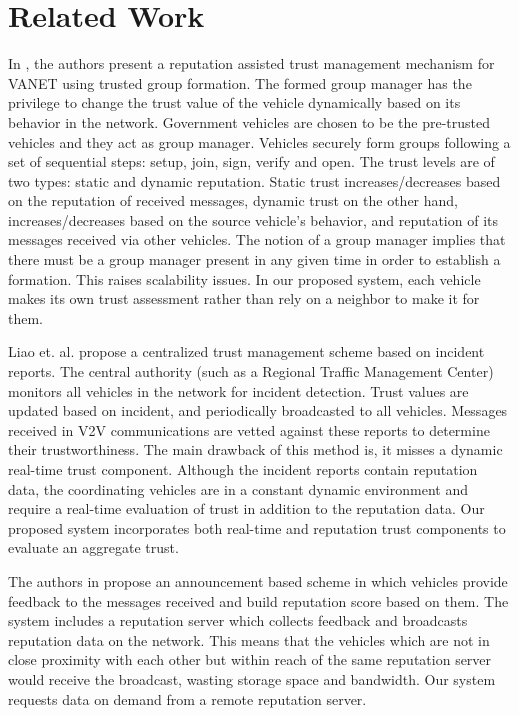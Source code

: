 \documentclass[conference]{IEEEtran}
\begin{document}
\section{Related Work} \label{lreview}
In \cite{tgroupFormVANET}, the authors present a reputation assisted trust management mechanism for VANET using trusted group formation. 
The formed group manager has the privilege to change the trust value of the vehicle dynamically based on its behavior in the network. Government vehicles are chosen 
to be the pre-trusted vehicles and they act as group manager. Vehicles securely form groups following a set of sequential steps: setup, join, sign, verify and open.
The trust levels are of two types: static and dynamic reputation. Static trust increases/decreases based on the reputation of received messages, dynamic trust on the
other hand, increases/decreases based on the source vehicle's behavior, and reputation of its messages received via other vehicles. The notion of a group manager implies that
there must be a group manager present in any given time in order to establish a formation. This raises scalability issues. In our proposed system, each vehicle makes its own trust assessment rather than rely on a neighbor to make it for them.

Liao et. al. \cite{tmodelVNBIRpts} propose a centralized trust management scheme based on incident reports.
The central authority (such as a Regional Traffic Management Center) monitors all vehicles in the network for incident detection. 
Trust values are updated based on incident, and periodically broadcasted to all vehicles. Messages received in V2V communications are vetted against these reports to determine their trustworthiness. The main drawback of this method is, it misses a dynamic real-time trust component. Although the incident reports contain reputation data, the coordinating vehicles are in a constant dynamic environment and require a real-time evaluation of trust in addition to the reputation data. Our proposed system incorporates both real-time and reputation trust components to evaluate an aggregate trust. 

The authors in \cite{rbasedVANETS} propose an announcement based scheme in which vehicles provide feedback to the messages received 
and build reputation score based on them. The system includes a reputation server which collects feedback and broadcasts reputation data on the network. This means that the vehicles which are not in close proximity with each other but within reach of the same reputation server would receive the broadcast, wasting storage space and bandwidth. Our system requests data on demand from a remote reputation server.  
\end{document}
